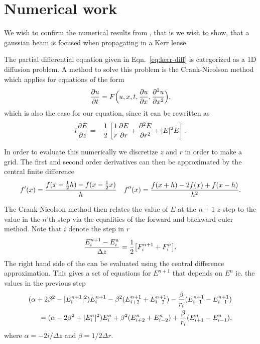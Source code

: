 \section{Numerical work}

We wish to confirm the numerical results from
\textcite{prl-selffocus}, that is we wish to show, that a gaussian
beam is focused when propagating in a Kerr lense.

The partial differential equation given in Eqn.~\eqref{eq:kerr-diff} is categorized as a 1D
diffusion problem. A method to solve this problem is the Crank-Nicolson method which applies for
equations of the form
\begin{equation}
  \label{eq:Crank-Nicolson}
  \frac{\partial u}{\partial t} = F \Big(u, x, t, \frac{\partial u}{\partial x}, \frac{\partial^2 u}{\partial x^2} \Big), 
\end{equation}
which is also the case for our equation, since it can be rewritten as
\begin{equation}
  \label{eq:kerr-diff-crank}
  i\frac{\partial E}{\partial z} = -\frac{1}{2} \left[\frac{1}{r} \frac{\partial E}{\partial r} + \frac{\partial^2 E}{\partial r^2} + |E|^{2} E \right]. 
\end{equation}

In order to evaluate this numerically we discretize $z$ and $r$ in order to make a grid. The first
and second order derivatives can then be approximated by the central finite difference
\begin{equation}
  \label{eq:central-diff}
  f'(x) = \frac{f(x+\frac{1}{2} h) - f(x - \frac{1}{2} x)}{h} \quad f''(x) = \frac{f(x+h) - 2f(x) + f(x-h)}{h^{2}}.
\end{equation}

The Crank-Nicolson method then relates the value of $E$ at the $n+1$ $z$-step to the value in the
$n$'th step via the equalities of the forward and backward euler method. Note that $i$ denote the
step in $r$
\begin{equation}
  \label{eq:Crank-Nicolson-discrete}
  \frac{E^{n+1}_{i} - E^{n}_{i}}{\Delta z} = \frac{1}{2} \big[F_{i}^{n+1}+F_{i}^{n} \big].
\end{equation}
The right hand side of the can be evaluated using the central difference approximation. This gives
a set of equations for $E^{n+1}$ that depends on $E^{n}$ ie. the values in the previous step
\begin{align}
  \notag
  (\alpha + 2\beta^{2} - |E_{i}^{n+1}|^{2})E_{i}^{n+1} - \beta^{2}(E_{i+2}^{n+1} + E_{i-2}^{n+1}) -
  \frac{\beta}{r_{i}} (E_{i+1}^{n+1} - E_{i-1}^{n+1}) \\
  = (\alpha - 2\beta^{2} + |E_{i}^{n}|^{2})E_{i}^{n} + \beta^{2}(E_{i+2}^{n} + E_{i-2}^{n}) +
  \frac{\beta}{r_{i}} (E_{i+1}^{n} - E_{i-1}^{n}), 
  \label{eq:kerr-long}
\end{align}
where $\alpha = -2i/\!{\Delta z}$ and $\beta = 1/{2 \Delta r}$.

